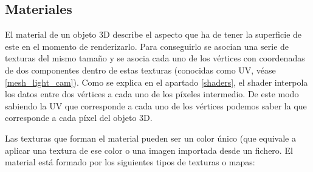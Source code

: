\subsection{Materiales}
\label{materials}
El material de un objeto 3D describe el aspecto que ha de tener la superficie de este en el momento de renderizarlo. Para conseguirlo se asocian una serie de texturas del mismo tamaño y se asocia cada uno de los vértices con coordenadas de dos componentes dentro de estas texturas (conocidas como UV, véase \ref{mesh_light_cam}). Como se explica en el apartado \ref{shaders}, el shader interpola los datos entre dos vértices a cada uno de los píxeles intermedio. De este modo sabiendo la UV que corresponde a cada uno de los vértices podemos saber la que corresponde a cada píxel del objeto 3D.

Las texturas que forman el material pueden ser un color único (que equivale a aplicar una textura de ese color o una imagen importada desde un fichero. El material está formado por los siguientes tipos de texturas o mapas:

